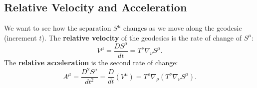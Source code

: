 \documentclass[11pt, a4paper]{report}
\begin{document}
\subsection*{Relative Velocity and Acceleration}
We want to see how the separation \(S^\mu\) changes as we move along the geodesic (increment \(t\)).
The \textbf{relative velocity} of the geodesics is the rate of change of \(S^\mu\):
\begin{equation}
V^\mu = \frac{D S^\mu}{dt} = T^\nu \nabla_\nu S^\mu.
\end{equation}
The \textbf{relative acceleration} is the second rate of change:
\begin{equation}
A^\mu = \frac{D^2 S^\mu}{dt^2} = \frac{D}{dt} (V^\mu) = T^\rho \nabla_\rho (T^\nu \nabla_\nu S^\mu).
\end{equation}
\end{document}
